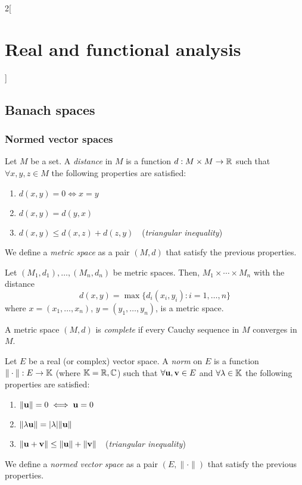 \documentclass[../../../main_math.tex]{subfiles}
\begin{document}
\begin{multicols}{2}[\section{Real and functional analysis}]
  \subsection{Banach spaces}
  \subsubsection{Normed vector spaces}
  \begin{definition}
    Let $M$ be a set. A \emph{distance} in $M$ is a function $d:M\times M\rightarrow\mathbb{R} $ such that $\forall x,y,z\in M$ the following properties are satisfied:
    \begin{enumerate}
      \item $d(x,y)=0\iff x=y$
      \item $d(x,y)=d(y,x)$
      \item $d(x,y)\leq d(x,z)+d(z,y)\quad$(\emph{triangular inequality})
    \end{enumerate}
    We define a \emph{metric space} as a pair $(M,d)$ that satisfy the previous properties.
  \end{definition}
  \begin{proposition}
    Let $(M_1,d_1),\ldots,(M_n,d_n)$ be metric spaces. Then, $M_1\times\cdots\times M_n$ with the distance $$d(x,y)=\max\{d_i(x_i,y_i):i=1,\ldots,n\}$$ where $x=(x_1,\ldots,x_n)$, $y=(y_1,\ldots,y_n)$, is a metric space.
  \end{proposition}
  \begin{definition}
    A metric space $(M,d)$ is \emph{complete} if every Cauchy sequence in $M$ converges in $M$.
  \end{definition}
  \begin{definition}
    Let $E$ be a real (or complex) vector space. A \emph{norm} on $E$ is a function $\|\cdot\|:E\rightarrow\mathbb{K}$ (where $\mathbb{K}=\mathbb{R},\mathbb{C}$) such that $\forall \boldsymbol{\mathrm{u}},\boldsymbol{\mathrm{v}}\in E$ and $\forall\lambda\in\mathbb{K} $ the following properties are satisfied:
    \begin{enumerate}[ref = Triangular inequality]
      \item $\|\boldsymbol{\mathrm{u}}\|=0\iff \boldsymbol{\mathrm{u}}=0$
      \item $\|\lambda \boldsymbol{\mathrm{u}}\|=|\lambda|\|\boldsymbol{\mathrm{u}}\|$
            \item\label{RFA_triangularineq} $\|\boldsymbol{\mathrm{u}}+\boldsymbol{\mathrm{v}}\|\leq \|\boldsymbol{\mathrm{u}}\|+\|\boldsymbol{\mathrm{v}}\|\quad$(\emph{triangular inequality})
    \end{enumerate}
    We define a \emph{normed vector space} as a pair $(E,\|\cdot\|)$ that satisfy the previous properties.
  \end{definition}

\end{multicols}
\end{document}
